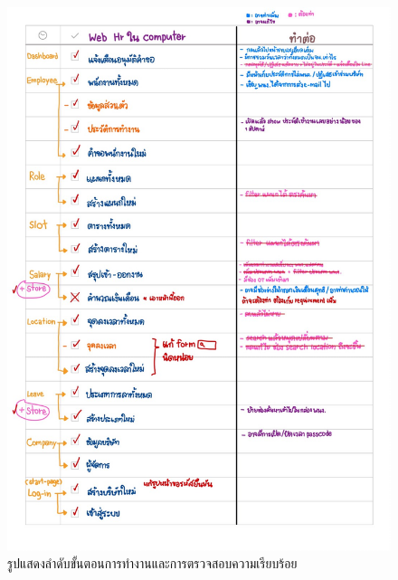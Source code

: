 \begin{figure}
  \begin{center}
    \includegraphics[width=14cm,keepaspectratio]{./images/design7.jpg}
  \end{center}
  \caption[รูปแสดงลำดับขั้นตอนการทำงานและการตรวจสอบความเรียบร้อย]{รูปแสดงลำดับขั้นตอนการทำงานและการตรวจสอบความเรียบร้อย} 
  
\end{figure}

